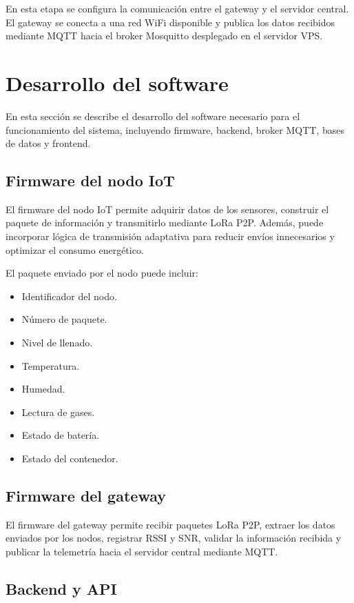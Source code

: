 En esta etapa se configura la comunicación entre el gateway y el servidor central. El gateway se conecta a una red WiFi disponible y publica los datos recibidos mediante MQTT hacia el broker Mosquitto desplegado en el servidor VPS.

\section{Desarrollo del software}

En esta sección se describe el desarrollo del software necesario para el funcionamiento del sistema, incluyendo firmware, backend, broker MQTT, bases de datos y frontend.

\subsection{Firmware del nodo IoT}

El firmware del nodo IoT permite adquirir datos de los sensores, construir el paquete de información y transmitirlo mediante LoRa P2P. Además, puede incorporar lógica de transmisión adaptativa para reducir envíos innecesarios y optimizar el consumo energético.

El paquete enviado por el nodo puede incluir:

\begin{itemize}
    \item Identificador del nodo.
    \item Número de paquete.
    \item Nivel de llenado.
    \item Temperatura.
    \item Humedad.
    \item Lectura de gases.
    \item Estado de batería.
    \item Estado del contenedor.
\end{itemize}

\subsection{Firmware del gateway}

El firmware del gateway permite recibir paquetes LoRa P2P, extraer los datos enviados por los nodos, registrar RSSI y SNR, validar la información recibida y publicar la telemetría hacia el servidor central mediante MQTT.

\subsection{Backend y API}

